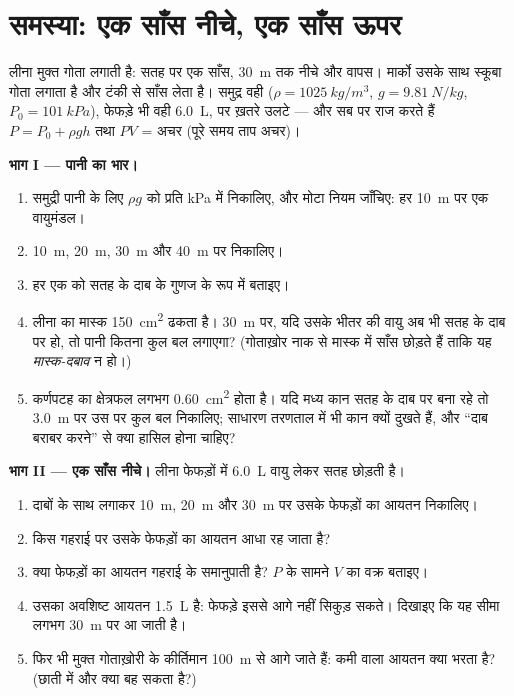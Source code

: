 \section{समस्या: एक साँस नीचे, एक साँस ऊपर}

\begin{problem}
\label{pb:g10:pressure:1}
लीना मुक्त गोता लगाती है: सतह पर एक साँस, \qty{30}{m} तक नीचे और वापस।
मार्को उसके साथ स्कूबा गोता लगाता है और टंकी से साँस लेता है। समुद्र वही
($\rho = \qty{1025}{kg/m^3}$, $g = \qty{9.81}{N/kg}$, $P_0 = \qty{101}{kPa}$), फेफड़े भी वही \qty{6.0}{L}, पर ख़तरे उलटे ---
और सब पर राज करते हैं $P = P_0 + \rho g h$ तथा $PV$ = अचर (पूरे समय ताप अचर)।

\medskip
\noindent\textbf{भाग I --- पानी का भार।}
\begin{enumerate}
  \item समुद्री पानी के लिए $\rho g$ को प्रति  \unit{kPa} में
        निकालिए, और मोटा नियम जाँचिए: हर \qty{10}{m} पर एक वायुमंडल।
  \item \qty{10}{m}, \qty{20}{m}, \qty{30}{m} और \qty{40}{m} पर 
        निकालिए।
  \item हर एक को सतह के दाब के गुणज के रूप में बताइए।
  \item लीना का मास्क \qty{150}{cm^2} ढकता है। \qty{30}{m} पर, यदि उसके भीतर की
        वायु अब भी सतह के दाब पर हो, तो पानी कितना कुल
        बल लगाएगा? (गोताख़ोर नाक से मास्क में साँस छोड़ते हैं
        ताकि यह \emph{मास्क-दबाव} न हो।)
  \item कर्णपटह का क्षेत्रफल लगभग \qty{0.60}{cm^2} होता है। यदि मध्य कान सतह के
        दाब पर बना रहे तो \qty{3.0}{m} पर उस पर कुल बल
        निकालिए; साधारण तरणताल में भी कान क्यों दुखते हैं, और ``दाब
        बराबर करने'' से क्या हासिल होना चाहिए?
\end{enumerate}

\medskip
\noindent\textbf{भाग II --- एक साँस नीचे।}
लीना फेफड़ों में \qty{6.0}{L} वायु लेकर सतह छोड़ती है।
\begin{enumerate}[resume]
  \item {} दाबों के साथ  लगाकर
        \qty{10}{m}, \qty{20}{m} और \qty{30}{m} पर उसके फेफड़ों का आयतन निकालिए।
  \item किस गहराई पर उसके फेफड़ों का आयतन आधा रह जाता है?
  \item क्या फेफड़ों का आयतन गहराई के समानुपाती है?  $P$ के सामने $V$ का वक्र बताइए।
  \item उसका अवशिष्ट आयतन \qty{1.5}{L} है: फेफड़े इससे आगे नहीं सिकुड़ सकते।
        दिखाइए कि यह सीमा लगभग \qty{30}{m} पर आ जाती है।
  \item फिर भी मुक्त गोताख़ोरी के कीर्तिमान \qty{100}{m} से आगे जाते हैं:
        कमी वाला आयतन क्या भरता है? (छाती में और क्या बह सकता है?)
\end{enumerate}


\end{problem}
